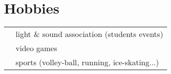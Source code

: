 \documentclass[oneside]{article}
\begin{document}
{\begin{minipage}[t][\textheight-2\fboxsep-2\fboxrule][t]{\dimexpr0.35\textwidth-2\fboxrule-2\fboxsep\relax}
        \section*{\large Hobbies}
        \begin{tabularx}{\textwidth}{cY}
            \faHeadset{} & light \& sound association (students events) \\
            \faGamepad{} & video games \\
            \faWalking{} & sports (volley-ball, running, ice-skating...) \\
        \end{tabularx}
        \vspace{.1cm}
        \vfill
    \end{minipage}
}%
\hfill
\end{document}
